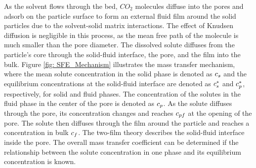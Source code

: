 \documentclass[../Article_Sensitivity_Analsysis.tex]{subfiles}
\begin{document}
	
	As the solvent flows through the bed, $CO_2$ molecules diffuse into the pores and adsorb on the particle surface to form an external fluid film around the solid particles due to the solvent-solid matrix interactions. The effect of Knudsen diffusion is negligible in this process, as the mean free path of the molecule is much smaller than the pore diameter. The dissolved solute diffuses from the particle's core through the solid-fluid interface, the pore, and the film into the bulk. Figure \ref{fig: SFE_Mechanism} illustrates the mass transfer mechanism, where the mean solute concentration in the solid phase is denoted as ${\color{black}c_s}$ and the equilibrium concentrations at the solid-fluid interface are denoted as ${\color{black}c_s^*}$ and ${\color{black}c_p^*}$, respectively, for solid and fluid phases. The concentration of the solutes in the fluid phase in the center of the pore is denoted as ${\color{black}c_{p}}$. As the solute diffuses through the pore, its concentration changes and reaches ${\color{black}c_{pf}}$ at the opening of the pore. The solute then diffuses through the film around the particle and reaches a concentration in bulk ${\color{black}c_f}$. The two-film theory describes the solid-fluid interface inside the pore. The overall mass transfer coefficient can be determined if the relationship between the solute concentration in one phase and its equilibrium concentration is known.
			
\end{document}
